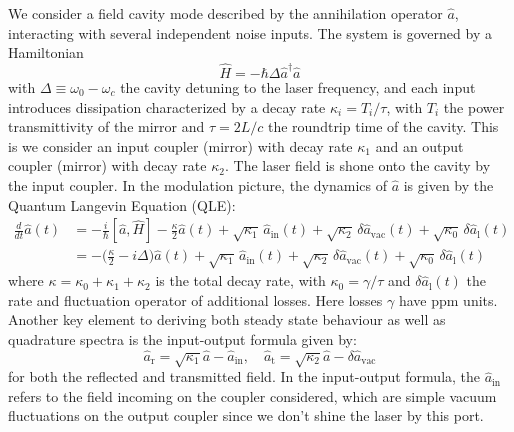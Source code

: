 We consider a field cavity mode described by the annihilation operator \(\hat{a}\), interacting with several independent noise inputs. The system is governed by a Hamiltonian 
\begin{equation}
\hat{H} = - \hbar \Delta  \hat{a}^\dagger \hat{a} 
\end{equation}
 with  $\Delta\equiv\omega_0 - \omega_c$ the cavity detuning to the laser frequency, and each input introduces dissipation characterized by a decay rate \(\kappa_i = T_i/\tau\), with $T_i$ the power transmittivity of the mirror and $\tau=2L/c$ the roundtrip time of the cavity. This is we consider an input coupler (mirror) with decay rate $\kappa_1$ and an output coupler (mirror) with decay rate $\kappa_2$. The laser field is shone onto the cavity by the input coupler. In the modulation picture, the dynamics of \(\hat{a}\) is given by the Quantum Langevin Equation (QLE):
%
\begin{equation}
\begin{split}
  \frac{d}{dt} \hat{a}(t) & = -\frac{i}{\hbar} [\hat{a}, \hat{H}] - \frac{\kappa}{2} \hat{a}(t) + \sqrt{\kappa_1} \, \hat{a}_{\mathrm{in}}(t)  + \sqrt{\kappa_2} \, \delta \hat{a}_{\mathrm{vac}}(t) + \sqrt{\kappa_0} \, \delta \hat{a}_{\mathrm{l}}(t) \\
  & = -\Big(\frac{\kappa}{2}-i\Delta\Big) \hat{a}(t) + \sqrt{\kappa_{\mathrm{1}}} \, \hat{a}_{\mathrm{in}}(t)  + \sqrt{\kappa_2} \, \delta \hat{a}_{\mathrm{vac}}(t)  + \sqrt{\kappa_0} \, \delta \hat{a}_{\mathrm{l}}(t) 
\label{eq:qle}
\end{split}
\end{equation}
where  \(\kappa = \kappa_0 + \kappa_1 + \kappa_2\) is the total decay rate, with $\kappa_0=\gamma/\tau$ and $ \delta \hat{a}_{\mathrm{l}}(t)$ the rate and fluctuation operator of additional losses. Here losses $\gamma$ have ppm units. Another key element to deriving both steady state behaviour as well as quadrature spectra is the input-output formula given by:
\begin{equation}
  \hat{a}_{\mathrm{r}} = \sqrt{\kappa_{1}}\hat{a} - \hat{a}_{\mathrm{in}} , \quad \hat{a}_{\mathrm{t}} = \sqrt{\kappa_{2}}\hat{a} - \delta \hat{a}_{\mathrm{vac}} 
\end{equation}
for both the reflected and transmitted field. In the input-output formula, the $\hat{a}_{\mathrm{in}}$ refers to the field incoming on the coupler considered, which are simple vacuum fluctuations on the output coupler since we don't shine the laser by this port.\\

